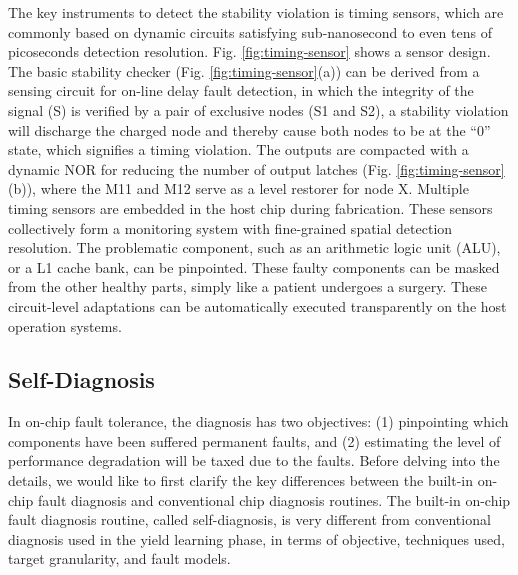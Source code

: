 The key instruments to detect the stability violation is timing sensors, which are commonly based on dynamic circuits satisfying sub-nanosecond to even tens of picoseconds detection resolution. Fig. \ref{fig:timing-sensor} shows a sensor design. The basic stability checker (Fig. \ref{fig:timing-sensor}(a)) can be derived from a sensing circuit for on-line delay fault detection, in which the integrity of the signal (S) is verified by a pair of exclusive nodes (S1 and S2), a stability violation will discharge the charged node and thereby cause both nodes to be at the “0” state, which signifies a timing violation. The outputs are compacted with a dynamic NOR for reducing the number of output latches (Fig. \ref{fig:timing-sensor}(b)), where the M11 and M12 serve as a level restorer for node X. Multiple timing sensors are embedded in the host chip during fabrication. These sensors collectively form a monitoring system with fine-grained spatial detection resolution. The problematic component, such as an arithmetic logic unit (ALU), or a L1 cache bank, can be pinpointed. These faulty components can be masked from the other healthy parts, simply like a patient undergoes a surgery. These circuit-level adaptations can be automatically executed transparently on the host operation systems.

\subsection{Self-Diagnosis}
In on-chip fault tolerance, the diagnosis has two objectives: (1) pinpointing which components have been suffered permanent faults, and (2) estimating the level of performance degradation will be taxed due to the faults. Before delving into the details, we would like to first clarify the key differences between the built-in on-chip fault diagnosis and conventional chip diagnosis routines. The built-in on-chip fault diagnosis routine, called self-diagnosis, is very different from conventional diagnosis used in the yield learning phase, in terms of objective, techniques used, target granularity, and fault models.

